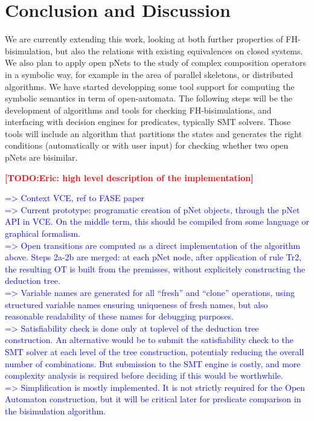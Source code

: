 \documentclass{lncs/llncs}
\newcommand{\TODO}[1]{\textcolor{red}{\textbf{[TODO:#1]}}}
\newcommand{\ERIC}[1]{\textcolor{blue}{#1}}
\begin{document}
\section{Conclusion and Discussion}
\label{section:conclusion}


We are currently extending this work,  looking at  both further properties of 
FH-bisimulation, but also
the relations with existing equivalences on closed systems.
We also plan to apply open pNets to the study of complex composition
operators in a symbolic way, for example in the area of parallel
skeletons, or distributed algorithms.
We have started developping some tool support for computing the
symbolic semantics in term of open-automata. The following steps will
be the development of algorithms and tools for checking 
FH-bisimulations, and interfacing with decision engines for
predicates, typically SMT solvers. Those tools will include
an algorithm that partitions the states and generates the right
conditions (automatically or with user input) for checking
whether two open pNets are bisimilar.

\TODO{Eric: high level description of the implementation}

\ERIC{
=> Context VCE, ref to FASE paper\\
=> Current prototype: programatic creation of pNet objects, through the pNet API in VCE. On the middle term, this should be compiled from some language or graphical formalism.\\
=> Open transitions are computed as a direct implementation of the algorithm above. Steps 2a-2b are merged: at each pNet node, after application of rule Tr2, the resulting OT is built from the premisses, without explicitely constructing the deduction tree. \\
=> Variable names are generated for all ``fresh'' and ``clone'' operations, using structured variable names ensuring uniqueness of fresh names, but also reasonable readability of these names for debugging purposes.\\
=> Satisfiability check is done only at toplevel of the deduction tree construction. An alternative would be to submit the satisfiability check to the SMT solver at each level of the tree construction, potentialy reducing the overall number of combinations. But submission to the SMT engine is costly, and more complexity analysis is required before deciding if this would be worthwhile.\\
=> Simplification is mostly implemented. It is not strictly required for the Open Automaton construction, but it will be critical later for predicate comparison in the bisimulation algorithm.}
\end{document}
